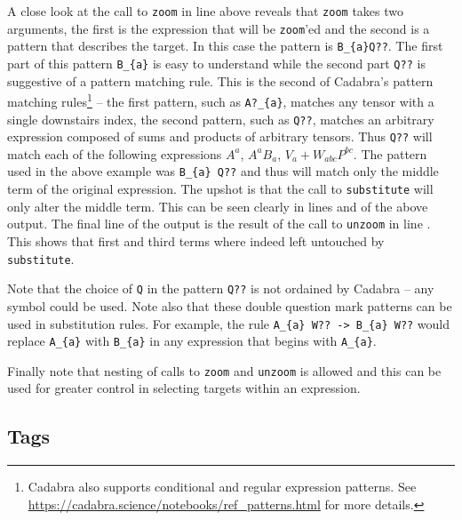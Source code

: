 \documentclass[a4paper,12pt]{article}
\numberwithin{equation}{section}%
\begin{document}
A close look at the call to \verb|zoom| in line  above reveals that
\verb|zoom| takes two arguments, the first is the expression that will be \verb|zoom|'ed and
the second is a pattern that describes the target. In this case the pattern is
\verb|B_{a}Q??|. The first part of this pattern \verb|B_{a}| is easy to understand while the
second part \verb|Q??| is suggestive of a pattern matching rule. This is the second of
Cadabra's pattern matching rules\footnote{Cadabra also supports conditional and regular
expression patterns. See \url{https://cadabra.science/notebooks/ref_patterns.html} for more
details.} -- the first pattern, such as \verb|A?_{a}|, matches any tensor with a single
downstairs index, the second pattern, such as \verb|Q??|, matches an arbitrary expression
composed of sums and products of arbitrary tensors. Thus \verb|Q??| will match each of the
following expressions $A^{a}$, $A^{a} B_{a}$, $V_{a} + W_{a b c} P^{b c}$. The pattern used
in the above example was \verb|B_{a} Q??| and thus will match only the middle term of the
original expression. The upshot is that the call to \verb|substitute| will only alter the
middle term. This can be seen clearly in lines  and  of
the above output. The final line of the output is the result of the call to \verb|unzoom| in
line . This shows that first and third terms where indeed left untouched
by \verb|substitute|.

Note that the choice of \verb|Q| in the pattern \verb|Q??| is not ordained by Cadabra -- any
symbol could be used. Note also that these double question mark patterns can be used in
substitution rules. For example, the rule \verb|A_{a} W?? -> B_{a} W??| would replace
\verb|A_{a}| with \verb|B_{a}| in any expression that begins with \verb|A_{a}|.

Finally note that nesting of calls to \verb|zoom| and \verb|unzoom| is allowed and this can
be used for greater control in selecting targets within an expression.

\subsection{Tags}
\end{document}
